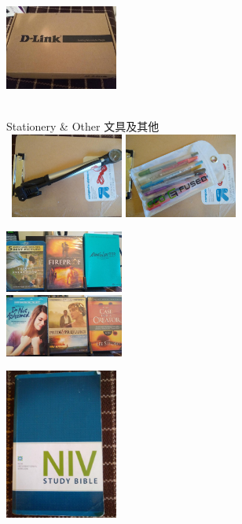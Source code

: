\documentclass{article}[12pt]
\begin{document}
{\begin{minipage}[t][\textheight-27pt][t]{445pt}
\begin{minipage}[b]{105pt}
\includegraphics[width=105pt]{verizon_modem02_mini.jpg} 	
\end{minipage} \\[5pt]
%
Stationery \& Other 文具及其他 \dotfill \\[5pt]
\mbox{ }\hspace{2pt}\includegraphics[width=105pt]{portable_air_bump_mini.jpg}
\includegraphics[width=105pt]{color_pens_mini.jpg}
\begin{minipage}[b]{110pt}
\includegraphics[width=110pt]{dvd05_mini.jpg} \\
\includegraphics[width=110pt]{dvd02_mini.jpg} 
\end{minipage}
\includegraphics[width=105pt]{NIV_bible_mini.jpg} \\[0.1in]

\end{minipage}}
\end{document}
